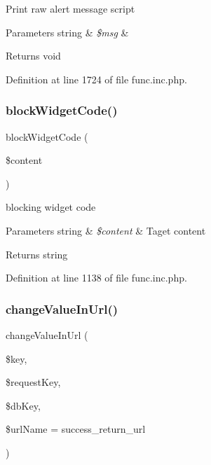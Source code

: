 Print raw alert message script


\begin{DoxyParams}[1]{Parameters}
string & {\em \$msg} & \\
\hline
\end{DoxyParams}
\begin{DoxyReturn}{Returns}
void 
\end{DoxyReturn}


Definition at line 1724 of file func.\+inc.\+php.

\hypertarget{func_8inc_8php_a3e4480709a0bb53f6478ae6521cda6f3}{}\label{func_8inc_8php_a3e4480709a0bb53f6478ae6521cda6f3} 
\subsubsection{\texorpdfstring{block\+Widget\+Code()}{blockWidgetCode()}}
{\footnotesize\ttfamily block\+Widget\+Code (\begin{DoxyParamCaption}\item[{}]{\$content }\end{DoxyParamCaption})}

blocking widget code


\begin{DoxyParams}[1]{Parameters}
string & {\em \$content} & Taget content \\
\hline
\end{DoxyParams}
\begin{DoxyReturn}{Returns}
string 
\end{DoxyReturn}


Definition at line 1138 of file func.\+inc.\+php.

\hypertarget{func_8inc_8php_a803ae4f2d5437f4bad33bf4b5d20c627}{}\label{func_8inc_8php_a803ae4f2d5437f4bad33bf4b5d20c627} 
\subsubsection{\texorpdfstring{change\+Value\+In\+Url()}{changeValueInUrl()}}
{\footnotesize\ttfamily change\+Value\+In\+Url (\begin{DoxyParamCaption}\item[{}]{\$key,  }\item[{}]{\$request\+Key,  }\item[{}]{\$db\+Key,  }\item[{}]{\$url\+Name = {\ttfamily \textquotesingle{}success\+\_\+return\+\_\+url\textquotesingle{}} }\end{DoxyParamCaption})}



